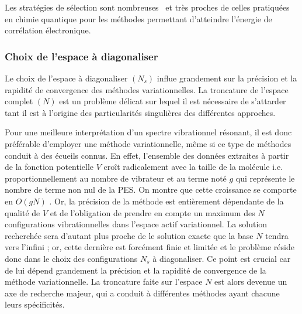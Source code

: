 Les stratégies de sélection sont nombreuses~\cite{pouchan1997ab,carter1997vibrational,koput2001ab,cassam2003alternative,gohaud2005new,culot1995vibrational} et très proches de celles pratiquées en chimie quantique pour les méthodes permettant d'atteindre l'énergie de corrélation électronique. 


\subsubsection*{Choix de l'espace à diagonaliser} 

Le choix de l'espace à diagonaliser $(N_s)$ influe grandement sur la précision et la rapidité de convergence des méthodes variationnelles. La troncature de l'espace complet $(N)$ est un problème délicat sur lequel il est nécessaire de s'attarder tant il est à l'origine des particularités singulières des différentes approches.

Pour une meilleure interprétation d'un spectre vibrationnel résonant, il est donc préférable d'employer une méthode variationnelle, même si ce type de méthodes conduit à des écueils connus. En effet, l'ensemble des données extraites à partir de la fonction potentielle $V$ croît radicalement avec la taille de la molécule i.e. proportionnellement au nombre de vibrateur et au terme noté $g$ qui représente le nombre de terme non nul de la PES. On montre que cette croissance se comporte en $O(gN)$ \cite{colaud2016}. Or, la précision de la méthode est entièrement dépendante de la qualité de $V$ et de l'obligation de prendre en compte un maximum des $N$ configurations vibrationnelles dans l’espace actif variationnel. La solution recherchée sera d'autant plus proche de le solution exacte que la base $N$ tendra vers l'infini ; or, cette dernière est forcément finie et limitée et le problème réside donc dans le choix des configurations $N_{s}$ à diagonaliser. Ce point est crucial car de lui dépend grandement la précision et la rapidité de convergence de la méthode variationnelle. La troncature faite sur l'espace $N$ est alors devenue un axe de recherche majeur, qui a conduit à différentes méthodes ayant chacune leurs spécificités.

